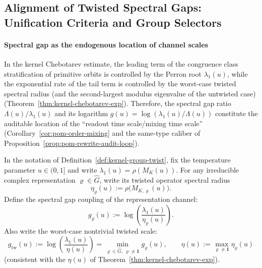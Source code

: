 \subsection{Alignment of Twisted Spectral Gaps: Unification Criteria and Group Selectors}\label{subsec:group-unification-spectral-alignment}

\paragraph{Spectral gap as the endogenous location of channel scales}
In the kernel Chebotarev estimate, the leading term of the congruence class stratification of primitive orbits is controlled by the Perron root \(\lambda_1(u)\),
while the exponential rate of the tail term is controlled by the worst-case twisted spectral radius (and the second-largest modulus eigenvalue of the untwisted case) (Theorem~\ref{thm:kernel-chebotarev-exp}).
Therefore, the spectral gap ratio \(\Lambda(u)/\lambda_1(u)\) and its logarithm
\(
g(u)=\log(\lambda_1(u)/\Lambda(u))
\)
constitute the auditable location of the ``readout time scale/mixing time scale'' (Corollary~\ref{cor:pom-order-mixing} and the same-type caliber of Proposition~\ref{prop:pom-rewrite-audit-loop}).

\begin{definition}\label{def:spec-coupling}
In the notation of Definition~\ref{def:kernel-group-twist}, fix the temperature parameter \(u\in(0,1]\) and write \(\lambda_1(u)=\rho(M_K(u))\).
For any irreducible complex representation \(\varrho\in\widehat G\), write its twisted operator spectral radius
\[
\eta_{\varrho}(u):=\rho\!\bigl(M_{K,\varrho}(u)\bigr).
\]
Define the spectral gap coupling of the representation channel:
\[
g_{\varrho}(u):=\log\!\left(\frac{\lambda_1(u)}{\eta_{\varrho}(u)}\right).
\]
Also write the worst-case nontrivial twisted scale:
\[
g_{\mathrm{tw}}(u):=\log\!\left(\frac{\lambda_1(u)}{\eta(u)}\right)
=\min_{\varrho\in\widehat G,\ \varrho\ne \mathbf{1}} g_{\varrho}(u),
\qquad
\eta(u):=\max_{\varrho\ne\mathbf{1}}\eta_{\varrho}(u)
\]
(consistent with the \(\eta(u)\) of Theorem~\ref{thm:kernel-chebotarev-exp}).
\end{definition}

